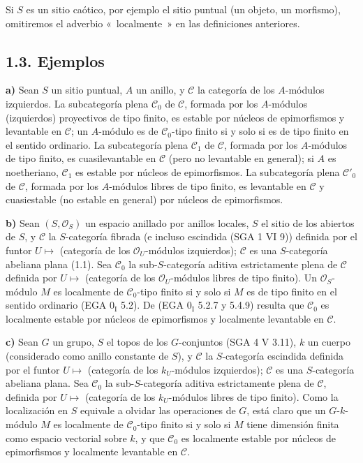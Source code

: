 Si \(S\) es un sitio caótico, por ejemplo el sitio puntual (un objeto, un morfismo), omitiremos el adverbio «~localmente~» en las definiciones anteriores.

\subsection*{1.3. Ejemplos}

\textbf{a)} Sean \(S\) un sitio puntual, \(A\) un anillo, y \(\mathcal C\) la categoría de los \(A\)-módulos izquierdos. La subcategoría plena \(\mathcal C_0\) de \(\mathcal C\), formada por los \(A\)-módulos (izquierdos) proyectivos de tipo finito, es estable por núcleos de epimorfismos y levantable en \(\mathcal C\); un \(A\)-módulo es de \(\mathcal C_0\)-tipo finito si y solo si es de tipo finito en el sentido ordinario. La subcategoría plena \(\mathcal C_1\) de \(\mathcal C\), formada por los \(A\)-módulos de tipo finito, es cuasilevantable en \(\mathcal C\) (pero no levantable en general); si \(A\) es noetheriano, \(\mathcal C_1\) es estable por núcleos de epimorfismos. La subcategoría plena \(\mathcal C'_0\) de \(\mathcal C\), formada por los \(A\)-módulos libres de tipo finito, es levantable en \(\mathcal C\) y cuasiestable (no estable en general) por núcleos de epimorfismos.

\textbf{b)} Sean \((S,\mathcal O_S)\) un espacio anillado por anillos locales, \(S\) el sitio de los abiertos de \(S\), y \(\mathcal C\) la \(S\)-categoría fibrada (e incluso escindida (SGA 1 VI 9)) definida por el funtor \(U\longmapsto\) (categoría de los \(\mathcal O_U\)-módulos izquierdos); \(\mathcal C\) es una \(S\)-categoría abeliana plana (1.1). Sea \(\mathcal C_0\) la sub-\(S\)-categoría aditiva estrictamente plena de \(\mathcal C\) definida por \(U\longmapsto\) (categoría de los \(\mathcal O_U\)-módulos libres de tipo finito). Un \(\mathcal O_S\)-módulo \(M\) es localmente de \(\mathcal C_0\)-tipo finito si y solo si \(M\) es de tipo finito en el sentido ordinario (EGA \(0_{\mathrm I}\) 5.2). De (EGA \(0_{\mathrm I}\) 5.2.7 y 5.4.9) resulta que \(\mathcal C_0\) es localmente estable por núcleos de epimorfismos y localmente levantable en \(\mathcal C\).

\textbf{c)} Sean \(G\) un grupo, \(S\) el topos de los \(G\)-conjuntos (SGA 4 V 3.11), \(k\) un cuerpo (considerado como anillo constante de \(S\)), y \(\mathcal C\) la \(S\)-categoría escindida definida por el funtor \(U\longmapsto\) (categoría de los \(k_U\)-módulos izquierdos); \(\mathcal C\) es una \(S\)-categoría abeliana plana. Sea \(\mathcal C_0\) la sub-\(S\)-categoría aditiva estrictamente plena de \(\mathcal C\), definida por \(U\longmapsto\) (categoría de los \(k_U\)-módulos libres de tipo finito).
Como la localización en \(S\) equivale a olvidar las operaciones de \(G\), está claro que un \(G\)-\(k\)-módulo \(M\) es localmente de \(\mathcal C_0\)-tipo finito si y solo si \(M\) tiene dimensión finita como espacio vectorial sobre \(k\), y que \(\mathcal C_0\) es localmente estable por núcleos de epimorfismos y localmente levantable en \(\mathcal C\).

